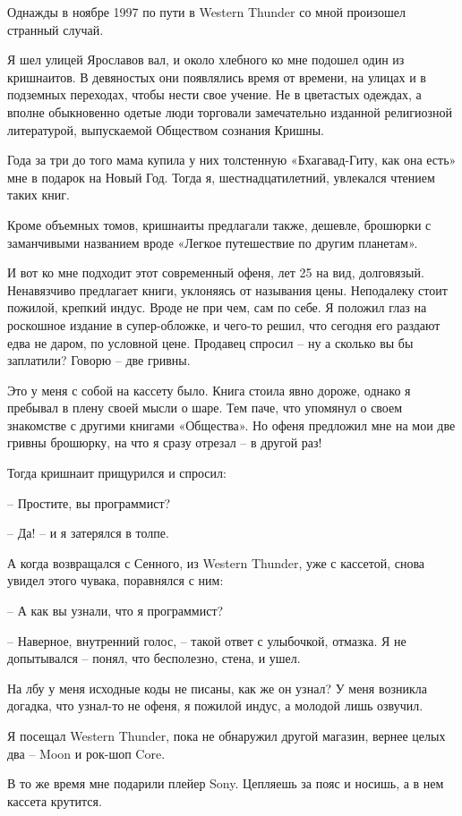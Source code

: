 Однажды в ноябре 1997 по пути в Western Thunder со мной произошел странный случай.

Я шел улицей Ярославов вал, и около хлебного ко мне подошел один из кришнаитов. В девяностых они появлялись время от времени, на улицах и в подземных переходах, чтобы нести свое учение. Не в цветастых одеждах, а вполне обыкновенно одетые люди торговали замечательно изданной религиозной литературой, выпускаемой Обществом сознания Кришны.

Года за три до того мама купила у них толстенную «Бхагавад-Гиту, как она есть» мне в подарок на Новый Год. Тогда я, шестнадцатилетний, увлекался чтением таких книг.

Кроме объемных томов, кришнаиты предлагали также, дешевле, брошюрки с заманчивыми названием вроде «Легкое путешествие по другим планетам».

И вот ко мне подходит этот современный офеня, лет 25 на вид, долговязый. Ненавязчиво предлагает книги, уклоняясь от называния цены. Неподалеку стоит пожилой, крепкий индус. Вроде не при чем, сам по себе. Я положил глаз на роскошное издание в супер-обложке, и чего-то решил, что сегодня его раздают едва не даром, по условной цене. Продавец спросил – ну а сколько вы бы заплатили? Говорю – две гривны.

Это у меня с собой на кассету было. Книга стоила явно дороже, однако я пребывал в плену своей мысли о шаре. Тем паче, что упомянул о своем знакомстве с другими книгами «Общества». Но офеня предложил мне на мои две гривны брошюрку, на что я сразу отрезал – в другой раз!

Тогда кришнаит прищурился и спросил:

 – Простите, вы программист?

 – Да! – и я затерялся в толпе.

А когда возвращался с Сенного, из Western Thunder, уже с кассетой, снова увидел этого чувака, поравнялся с ним:

 – А как вы узнали, что я программист?

 – Наверное, внутренний голос, – такой ответ с улыбочкой, отмазка. Я не допытывался – понял, что бесполезно, стена, и ушел.

На лбу у меня исходные коды не писаны, как же он узнал? У меня возникла догадка, что узнал-то не офеня, я пожилой индус, а молодой лишь озвучил.

Я посещал Western Thunder, пока не обнаружил другой магазин, вернее целых два – Moon и рок-шоп Core. 

В то же время мне подарили плейер Sony. Цепляешь за пояс и носишь, а в нем кассета крутится. 

